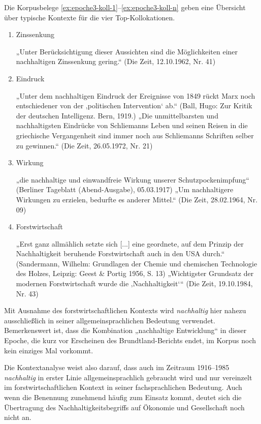 \documentclass[
    german,
    a4paper,%
    12pt,%
    oneside,%
    toc=bibliography,
    final,
]{scrartcl}
\begin{document}
Die Korpusbelege \ref{ex:epoche3-koll-1}–\ref{ex:epoche3-koll-n} geben eine Übersicht über typische Kontexte für die vier Top-Kollokationen.

\begin{enumerate}
\item Zinssenkung
	\begin{exe}
	\ex \label{ex:epoche3-koll-1} „Unter Berücksichtigung dieser Aussichten sind die Möglichkeiten einer nachhaltigen Zinssenkung gering.“ (Die Zeit, 12.10.1962, Nr. 41)
	\end{exe}
\item Eindruck
	\begin{exe}
	\ex „Unter dem nachhaltigen Eindruck der Ereignisse von 1849 rückt Marx noch entschiedener von der ‚politischen Intervention‘ ab.“ (Ball, Hugo: Zur Kritik der deutschen Intelligenz. Bern, 1919.)
	\ex „Die unmittelbarsten und nachhaltigsten Eindrücke von Schliemanns Leben und seinen Reisen in die griechische Vergangenheit sind immer noch aus Schliemanns Schriften selber zu gewinnen.“ (Die Zeit, 26.05.1972, Nr. 21)
	\end{exe}
\item Wirkung
	\begin{exe}
	\ex „die nachhaltige und einwandfreie Wirkung unserer Schutzpockenimpfung“ (Berliner Tageblatt (Abend-Ausgabe), 05.03.1917)
	\ex „Um nachhaltigere Wirkungen zu erzielen, bedurfte es anderer Mittel.“ (Die Zeit, 28.02.1964, Nr. 09)
	\end{exe}
\item Forstwirtschaft
	\begin{exe}
	\ex „Erst ganz allmählich setzte sich [...] eine geordnete, auf dem Prinzip der Nachhaltigkeit beruhende Forstwirtschaft auch in den USA durch.“ (Sandermann, Wilhelm: Grundlagen der Chemie und chemischen Technologie des Holzes, Leipzig: Geest \& Portig 1956, S. 13)
	\ex \label{ex:epoche3-koll-n} „Wichtigster Grundsatz der modernen Forstwirtschaft wurde die ‚Nachhaltigkeit‘“ (Die Zeit, 19.10.1984, Nr. 43)
	\end{exe}
\end{enumerate}

Mit Ausnahme des forstwirtschaftlichen Kontexts wird \textit{nachhaltig} hier nahezu ausschließlich in seiner allgemeinsprachlichen Bedeutung verwendet. Bemerkenswert ist, dass die Kombination „nachhaltige Entwicklung“ in dieser Epoche, die kurz vor Erscheinen des Brundtland-Berichts endet, im Korpus noch kein einziges Mal vorkommt.

Die Kontextanalyse weist also darauf, dass auch im Zeitraum 1916–1985 \textit{nachhaltig} in erster Linie allgemeinsprachlich gebraucht wird und nur vereinzelt im forstwirtschaftlichen Kontext in seiner fachsprachlichen Bedeutung. Auch wenn die Benennung zunehmend häufig zum Einsatz kommt, deutet sich die Übertragung des Nachhaltigkeitsbegriffs auf Ökonomie und Gesellschaft noch nicht an.
\end{document}
